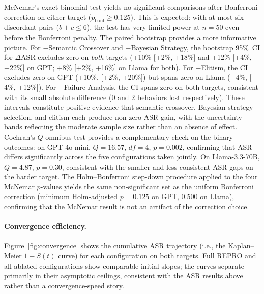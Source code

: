 McNemar's exact binomial test yields no significant comparisons after
Bonferroni correction on either target ($p_\text{bonf} \geq 0.125$).
This is expected: with at most six discordant pairs ($b{+}c \leq 6$),
the test has very limited power at $n{=}50$ even before the Bonferroni
penalty.
The paired bootstrap provides a more informative picture.
For $-$Semantic Crossover and $-$Bayesian Strategy, the bootstrap 95\%~CI
for $\Delta\text{ASR}$ excludes zero on \emph{both} targets
(\mbox{+10\%} [+2\%, +18\%] and \mbox{+12\%} [+4\%, +22\%] on GPT;
\mbox{+8\%} [+2\%, +16\%] on Llama for both).
For $-$Elitism, the CI excludes zero on GPT (+10\%, [+2\%, +20\%]) but
spans zero on Llama ($-$4\%, [--4\%, +12\%]).
For $-$Failure Analysis, the CI spans zero on both targets, consistent with
its small absolute difference (0 and 2 behaviors lost respectively).
These intervals constitute positive evidence that semantic crossover,
Bayesian strategy selection, and elitism each produce non-zero ASR gain,
with the uncertainty bands reflecting the moderate sample size rather than
an absence of effect.
Cochran's $Q$ omnibus test provides a complementary check on the binary
outcomes: on GPT-4o-mini, $Q{=}16.57$, $df{=}4$, $p{=}0.002$, confirming
that ASR differs significantly across the five configurations taken jointly.
On Llama-3.3-70B, $Q{=}4.87$, $p{=}0.30$, consistent with the smaller and
less consistent ASR gaps on the harder target.
The Holm–Bonferroni step-down procedure applied to the four McNemar
$p$-values yields the same non-significant set as the uniform Bonferroni
correction (minimum Holm-adjusted $p{=}0.125$ on GPT, $0.500$ on Llama),
confirming that the McNemar result is not an artifact of the correction
choice.

\paragraph{Convergence efficiency.}

Figure~\ref{fig:convergence} shows the cumulative ASR trajectory
(i.e., the Kaplan--Meier $1{-}S(t)$ curve) for each configuration on
both targets.
Full REPRO and all ablated configurations show comparable initial slopes;
the curves separate primarily in their asymptotic ceilings, consistent
with the ASR results above rather than a convergence-speed story.

